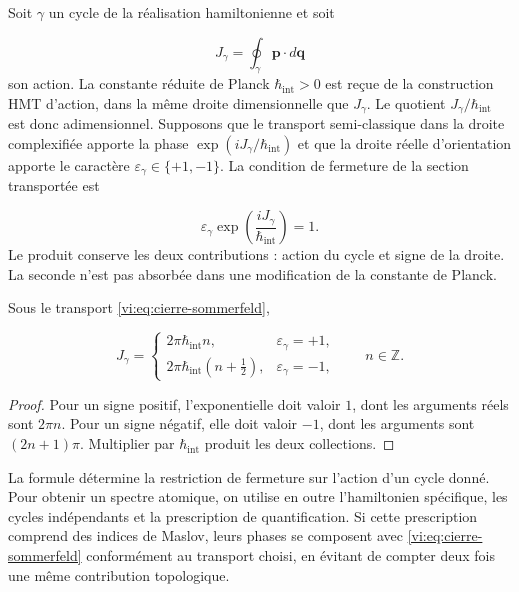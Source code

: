 Soit $\gamma$ un cycle de la réalisation hamiltonienne et soit

\begin{equation}
 J_\gamma=\oint_\gamma\mathbf p\cdot d\mathbf q
 \label{vi:eq:accion-ciclo}
\end{equation}
son action. La constante réduite de Planck
$\hbar_{\mathrm{int}}>0$ est reçue de la construction HMT
d’action, dans la même droite dimensionnelle que $J_\gamma$.
Le quotient $J_\gamma/\hbar_{\mathrm{int}}$ est donc
adimensionnel. Supposons que le transport semi-classique dans la
droite complexifiée apporte la phase
$\exp(iJ_\gamma/\hbar_{\mathrm{int}})$ et que la droite réelle
d’orientation apporte le caractère
$\varepsilon_\gamma\in\{+1,-1\}$. La condition de fermeture
de la section transportée est

\begin{equation}
 \varepsilon_\gamma
       \exp\!\left(\frac{iJ_\gamma}{\hbar_{\mathrm{int}}}\right)=1.
 \label{vi:eq:cierre-sommerfeld}
\end{equation}
Le produit conserve les deux contributions : action du
cycle et signe de la droite. La seconde n’est pas absorbée dans une
modification de la constante de Planck.


\begin{theorem}
\label{vi:thm:sommerfeld}
Sous le transport \eqref{vi:eq:cierre-sommerfeld},

\begin{equation}
 J_\gamma=
 \begin{cases}
  2\pi\hbar_{\mathrm{int}}n,
          &\varepsilon_\gamma=+1,\\[1mm]
  2\pi\hbar_{\mathrm{int}}(n+\tfrac12),
          &\varepsilon_\gamma=-1,
 \end{cases}
 \qquad n\in\mathbb Z.
 \label{vi:eq:accion-sommerfeld}
\end{equation}
\end{theorem}
\begin{proof}
Pour un signe positif, l’exponentielle doit valoir $1$, dont les
arguments réels sont $2\pi n$. Pour un signe négatif, elle doit
valoir $-1$, dont les arguments sont $(2n+1)\pi$. Multiplier
par $\hbar_{\mathrm{int}}$ produit les deux collections.

\end{proof}

La formule détermine la restriction de fermeture sur
l’action d’un cycle donné. Pour obtenir un spectre atomique,
on utilise en outre l’hamiltonien spécifique, les cycles
indépendants et la prescription de quantification. Si cette
prescription comprend des indices de Maslov, leurs phases se
composent avec \eqref{vi:eq:cierre-sommerfeld} conformément au
transport choisi, en évitant de compter deux fois une même
contribution topologique.


